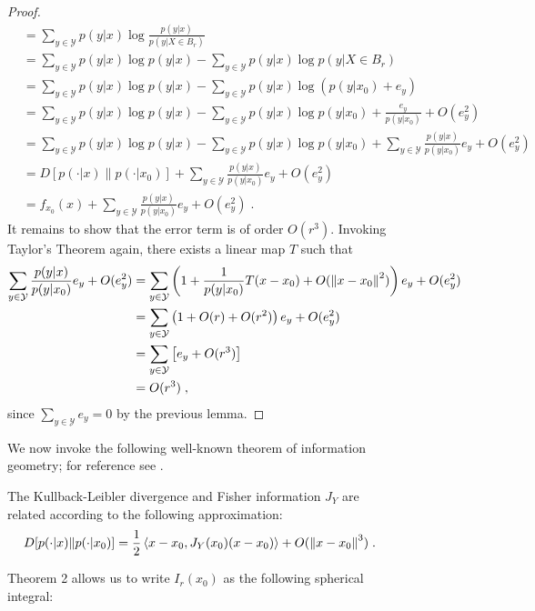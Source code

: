 \documentclass[english]{scrartcl}
\begin{document}
\begin{figure}
\begin{proof}
\begin{align*}
			&= \sum_{y\in \mathcal{Y}} p(y|x) \log \frac{p(y|x)}{p(y|X \in B_r)} \\
			&= \sum_{y\in \mathcal{Y}} p(y|x) \log p(y|x) - \sum_{y \in \mathcal{Y}} p(y|x) \log p(y|X \in B_r)\; \\
			&= \sum_{y\in \mathcal{Y}} p(y|x) \log p(y|x) - \sum_{y \in \mathcal{Y}} p(y|x) \log (p(y|x_0) + e_y) \\ 
			&= \sum_{y\in \mathcal{Y}} p(y|x) \log p(y|x) - \sum_{y \in \mathcal{Y}} p(y|x) \log p(y|x_0) + \frac{e_y}{p(y|x_0)} + O(e_y^2)   \\
			&= \sum_{y\in \mathcal{Y}} p(y|x) \log p(y|x) - \sum_{y \in \mathcal{Y}} p(y|x) \log p(y|x_0) + \sum_{y\in \mathcal{Y}} \frac{p(y|x)}{p(y|x_0)}e_y + O(e_y^2) \\
			&= D[p(\cdot|x)\|p(\cdot|x_0)] + \sum_{y\in \mathcal{Y}} \frac{p(y|x)}{p(y|x_0)}e_y + O(e_y^2) \\
			&= f_{x_0}(x) + \sum_{y\in \mathcal{Y}} \frac{p(y|x)}{p(y|x_0)}e_y + O(e_y^2)\;.
		\end{align*}
		It remains to show that the error term is of order $O(r^3)$. Invoking Taylor's Theorem again, there exists a linear map $T$ such that 
		\begin{align*}
			\sum_{y\in \mathcal{Y}} \frac{p(y|x)}{p(y|x_0)}e_y + O(e_y^2) &= \sum_{y\in \mathcal{Y}} \left(1 +  \frac{1}{p(y|x_0)} T(x - x_0) + O(\left\lVert x - x_0\right\rVert^2) \right)e_y + O(e_y^2) \\
			&= \sum_{y\in \mathcal{Y}} \left(1 +  O(r) + O(r^2) \right)e_y + O(e_y^2) \\
			&= \sum_{y\in\mathcal{Y}}\left[e_y + O(r^3)\right] \\
			&= O(r^3)\;, 
		\end{align*}
		since $\sum_{y\in \mathcal{Y}} e_y = 0$ by the previous lemma. 
	\end{proof}

	We now invoke the following well-known theorem of information geometry; for reference see \cite{Amari2000}. 

	\begin{thm}
		The Kullback-Leibler divergence and Fisher information $J_Y$ are related according to the following approximation: 
		\begin{equation*}
			D[p(\cdot|x)\|p(\cdot|x_0)] = \frac{1}{2} \left<x - x_0, J_Y(x_0)(x - x_0)\right> + O(\left\lVert x - x_0\right\rVert^3)\;. 
		\end{equation*}
	\end{thm}

	Theorem 2 allows us to write $I_r(x_0)$ as the following spherical integral: 


\end{figure}
\end{document}
